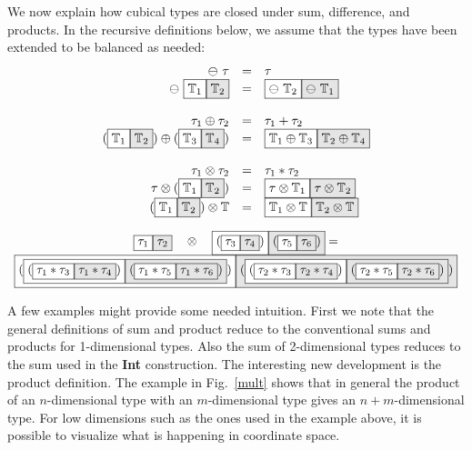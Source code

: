 \documentclass[authoryear,preprint]{sigplanconf}
\newcommand{\cubt}{\mathbb{T}}
\newcommand{\nodet}[2]{\fcolorbox{black}{white}{$#1$}\fcolorbox{black}{gray!20}{$#2$}}
\begin{document}
We now explain how cubical types are closed under sum, difference, and
products. In the recursive definitions below, we assume that the types have
been extended to be balanced as needed:
\[\begin{array}{rcl}
\ominus~\tau &=& \tau \\
\ominus~\nodet{\cubt_1}{\cubt_2} &=& \nodet{\ominus~\cubt_2}{\ominus~\cubt_1} \\
\\
\tau_1 \oplus \tau_2 &=& \tau_1 + \tau_2 \\
(\nodet{\cubt_1}{\cubt_2}) \oplus (\nodet{\cubt_3}{\cubt_4}) &=& 
  \nodet{\cubt_1 \oplus \cubt_3}{\cubt_2 \oplus \cubt_4} \\
\\
\tau_1 \otimes \tau_2 &=& \tau_1 * \tau_2 \\
\tau \otimes (\nodet{\cubt_1}{\cubt_2}) &=& 
  \nodet{\tau \otimes \cubt_1}{\tau \otimes \cubt_2} \\
(\nodet{\cubt_1}{\cubt_2}) \otimes \cubt &=& 
  \nodet{\cubt_1 \otimes \cubt}{\cubt_2 \otimes \cubt}
\end{array}\]

\begin{figure*}
\[\begin{array}{c}
\nodet{\tau_1}{\tau_2}
\quad\otimes\quad
\nodet{(\nodet{\tau_3}{\tau_4})}{(\nodet{\tau_5}{\tau_6})} = 
\\
\nodet{(\nodet{{(\nodet{\tau_1*\tau_3}{\tau_1*\tau_4})}}
              {{(\nodet{\tau_1*\tau_5}{\tau_1*\tau_6})}})}
      {(\nodet{{(\nodet{\tau_2*\tau_3}{\tau_2*\tau_4})}}
              {{(\nodet{\tau_2*\tau_5}{\tau_2*\tau_6})}})}
\end{array}\]
\caption{\label{mult}Example of multiplication of two cubical types.}
\end{figure*}

A few examples might provide some needed intuition. First we note that the
general definitions of sum and product reduce to the conventional sums and
products for 1-dimensional types. Also the sum of 2-dimensional types reduces
to the sum used in the \textbf{Int} construction. The interesting new
development is the product definition. The example in Fig.~\ref{mult} shows
that in general the product of an $n$-dimensional type with an
$m$-dimensional type gives an $n+m$-dimensional type. For low dimensions such
as the ones used in the example above, it is possible to visualize what is
happening in coordinate space.
\end{document}

